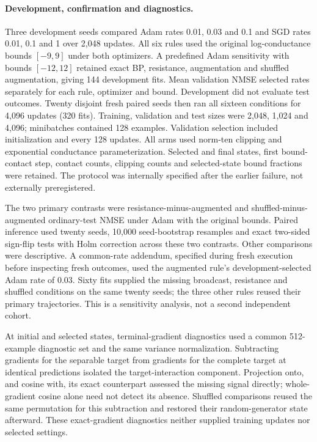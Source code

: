 \paragraph{Development, confirmation and diagnostics.}
Three development seeds compared Adam rates 0.01, 0.03 and 0.1 and SGD
rates 0.01, 0.1 and 1 over 2,048 updates. All six rules used the original
log-conductance bounds $[-9,9]$ under both optimizers. A predefined Adam
sensitivity with bounds $[-12,12]$ retained exact BP, resistance,
augmentation and shuffled augmentation, giving 144 development fits.
Mean validation NMSE selected rates separately for each rule, optimizer and
bound. Development did not evaluate test outcomes. Twenty disjoint fresh
paired seeds then ran all sixteen conditions for 4,096 updates (320 fits).
Training, validation and test sizes were 2,048, 1,024 and 4,096; minibatches
contained 128 examples. Validation selection included initialization and
every 128 updates. All arms used norm-ten clipping and exponential
conductance parameterization. Selected and final states, first bound-contact
step, contact counts, clipping counts and selected-state bound fractions
were retained. The protocol was internally specified after the earlier
failure, not externally preregistered.

The two primary contrasts were resistance-minus-augmented and
shuffled-minus-augmented ordinary-test NMSE under Adam with the original
bounds. Paired inference used twenty seeds, 10,000 seed-bootstrap resamples
and exact two-sided sign-flip tests with Holm correction across these two
contrasts. Other comparisons were descriptive. A common-rate addendum,
specified during fresh execution before inspecting fresh outcomes, used
the augmented rule's development-selected Adam rate of 0.03. Sixty fits
supplied the missing broadcast, resistance and shuffled conditions on the
same twenty seeds; the three other rules reused their primary trajectories.
This is a sensitivity analysis, not a second independent cohort.

At initial and selected states, terminal-gradient diagnostics used a common
512-example diagnostic set and the same variance normalization. Subtracting
gradients for the separable target from gradients for the complete target
at identical predictions isolated the target-interaction component.
Projection onto, and cosine with, its exact counterpart assessed the missing
signal directly; whole-gradient cosine alone need not detect its absence.
Shuffled comparisons reused the same permutation for this subtraction and
restored their random-generator state afterward. These exact-gradient
diagnostics neither supplied training updates nor selected settings.

